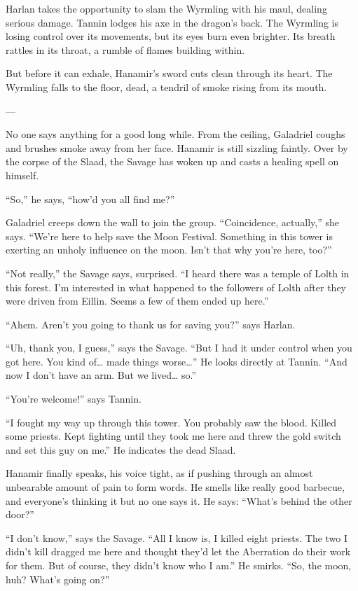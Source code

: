 \documentclass[smalldemyvopaper,11pt,twoside,onecolumn,openright,extrafontsizes]{memoir}
\begin{document}
Harlan takes the opportunity to slam the Wyrmling with his maul, dealing
serious damage. Tannin lodges his axe in the dragon's back. The Wyrmling
is losing control over its movements, but its eyes burn even brighter.
Its breath rattles in its throat, a rumble of flames building within.

But before it can exhale, Hanamir's sword cuts clean through its heart.
The Wyrmling falls to the floor, dead, a tendril of smoke rising from
its mouth.

---

No one says anything for a good long while. From the ceiling, Galadriel
coughs and brushes smoke away from her face. Hanamir is still sizzling
faintly. Over by the corpse of the Slaad, the Savage has woken up and
casts a healing spell on himself.

``So,'' he says, ``how'd you all find me?''

Galadriel creeps down the wall to join the group. ``Coincidence,
actually,'' she says. ``We're here to help save the Moon Festival.
Something in this tower is exerting an unholy influence on the moon.
Isn't that why you're here, too?''

``Not really,'' the Savage says, surprised. ``I heard there was a temple
of Lolth in this forest. I'm interested in what happened to the
followers of Lolth after they were driven from Eillin. Seems a few of
them ended up here.''

``Ahem. Aren't you going to thank us for saving you?'' says Harlan.

``Uh, thank you, I guess,'' says the Savage. ``But I had it under
control when you got here. You kind of\ldots{} made things
worse\ldots{}'' He looks directly at Tannin. ``And now I don't have an
arm. But we lived\ldots{} so.''

``You're welcome!'' says Tannin.

``I fought my way up through this tower. You probably saw the blood.
Killed some priests. Kept fighting until they took me here and threw the
gold switch and set this guy on me.'' He indicates the dead Slaad.

Hanamir finally speaks, his voice tight, as if pushing through an almost
unbearable amount of pain to form words. He smells like really good
barbecue, and everyone's thinking it but no one says it. He says:
``What's behind the other door?''

``I don't know,'' says the Savage. ``All I know is, I killed eight
priests. The two I didn't kill dragged me here and thought they'd let
the Aberration do their work for them. But of course, they didn't know
who I am.'' He smirks. ``So, the moon, huh? What's going on?''
\end{document}
